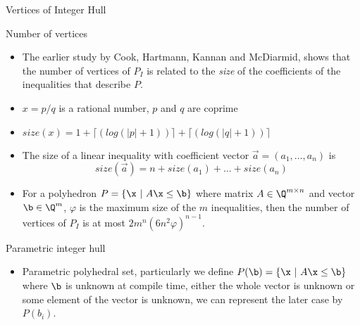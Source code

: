 \begin{frame}{Vertices of Integer Hull}
	\begin{block}{Number of vertices}
		\begin{itemize}
			\item The earlier study by Cook,
			Hartmann, Kannan and McDiarmid, shows that the number of vertices of $P_I$ is related to 
			the {\textit{size}} of the coefficients of the inequalities that describe $P$.
			\item $x = p/q$ is a rational number, $p$ and $q$ are coprime
			\item $size(x) = 1 + \lceil(log(\lvert p\rvert + 1))\rceil + \lceil(log(\lvert q\rvert + 1))\rceil$
			\item The size of a linear inequality with coefficient vector $\vec{a} = (a_1,\ldots,a_n)$ is 
			\[size(\vec{a}) = n + size(a_1) + \ldots + size(a_n)\]
			\item For a polyhedron $P = \{\x \ | \ A\x \leq \b \}$ where matrix $A \in \Q^{m \times n}$ and vector $\b \in \Q^m$, $\varphi$ is the maximum size of the $m$ inequalities, then the number of vertices of $P_I$ is at most $2m^n(6n^2\varphi)^{n-1}$. 	
		\end{itemize}
		
	\end{block}
\end{frame}

\begin{frame}{Parametric integer hull}
	\begin{block}{}
		\begin{itemize}
			\item Parametric polyhedral set, particularly we define
			$P(\b) = \{\x \ | \ A\x \leq \b \}$ where $\b$ is unknown at compile time, either the whole vector is unknown or some element of the vector is unknown, we can represent the later case by $P(b_i)$.
		\end{itemize}
		
	\end{block}
	\begin{block}{}
		\begin{columns}
			\begin{column}{0.5\textwidth}
				\begin{center}
				\end{center}
			\end{column}
			\begin{column}{0.5\textwidth}
				\begin{center}
				\end{center}
			\end{column}
		\end{columns}
	\end{block}
\end{frame}

